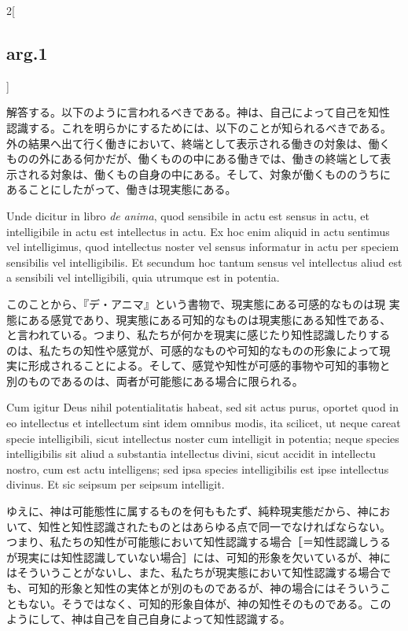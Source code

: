\documentclass[paper=a4paper,fontsize=10pt,jafontsize=9pt,titlepage]{jlreq}
\begin{document}
\begin{paracol}{2}[\subsection{arg.1}]
\switchcolumn

解答する。以下のように言われるべきである。神は、自己によって自己を知性
認識する。これを明らかにするためには、以下のことが知られるべきである。
外の結果へ出て行く働きにおいて、終端として表示される働きの対象は、働く
ものの外にある何かだが、働くものの中にある働きでは、働きの終端として表
示される対象は、働くもの自身の中にある。そして、対象が働くもののうちに
あることにしたがって、働きは現実態にある。

\switchcolumn*

Unde dicitur in libro {\itshape de anima}, quod sensibile in actu est
sensus in actu, et intelligibile in actu est intellectus in actu. Ex
hoc enim aliquid in actu sentimus vel intelligimus, quod intellectus
noster vel sensus informatur in actu per speciem sensibilis vel
intelligibilis. Et secundum hoc tantum sensus vel intellectus aliud
est a sensibili vel intelligibili, quia utrumque est in potentia.

\switchcolumn

このことから、『デ・アニマ』という書物で、現実態にある可感的なものは現
実態にある感覚であり、現実態にある可知的なものは現実態にある知性である、
と言われている。つまり、私たちが何かを現実に感じたり知性認識したりする
のは、私たちの知性や感覚が、可感的なものや可知的なものの形象によって現
実に形成されることによる。そして、感覚や知性が可感的事物や可知的事物と
別のものであるのは、両者が可能態にある場合に限られる。

\switchcolumn*

Cum igitur Deus nihil potentialitatis habeat, sed sit actus purus,
oportet quod in eo intellectus et intellectum sint idem omnibus modis,
ita scilicet, ut neque careat specie intelligibili, sicut intellectus
noster cum intelligit in potentia; neque species intelligibilis sit
aliud a substantia intellectus divini, sicut accidit in intellectu
nostro, cum est actu intelligens; sed ipsa species intelligibilis est
ipse intellectus divinus. Et sic seipsum per seipsum intelligit.

\switchcolumn

ゆえに、神は可能態性に属するものを何ももたず、純粋現実態だから、神にお
いて、知性と知性認識されたものとはあらゆる点で同一でなければならない。
つまり、私たちの知性が可能態において知性認識する場合［＝知性認識しうる
が現実には知性認識していない場合］には、可知的形象を欠いているが、神に
はそういうことがないし、また、私たちが現実態において知性認識する場合で
も、可知的形象と知性の実体とが別のものであるが、神の場合にはそういうこ
ともない。そうではなく、可知的形象自体が、神の知性そのものである。この
ようにして、神は自己を自己自身によって知性認識する。


\end{paracol}
\end{document}

